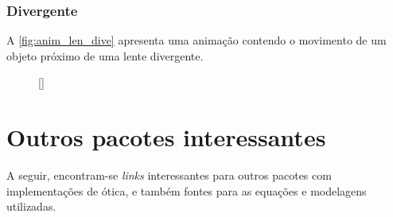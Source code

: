 \documentclass[a4paper,10pt]{article}
\begin{document}
\subsubsection{Divergente}

A \autoref{fig:anim_len_dive} apresenta uma animação contendo o movimento de um objeto próximo de uma lente divergente.

\begin{figure}[!ht]
  \centering
  [\linewidth]{
  }
\end{figure}

\section{Outros pacotes interessantes}

A seguir, encontram-se \textit{links} interessantes para outros pacotes com implementações de ótica, e também fontes para as equações e modelagens utilizadas.
\end{document}
